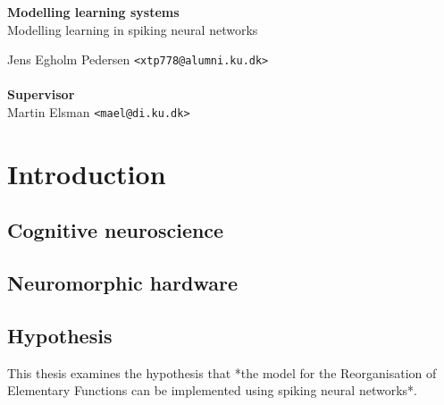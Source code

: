\documentclass[a4paper,oneside]{memoir}
\begin{document}
    \thispagestyle{empty}
    \begin{adjustwidth}{-3cm}{-1.5cm}
    \vspace*{2.5cm}
    \textbf{\Huge Modelling learning systems} \\
    \vspace*{.8cm}
    {\huge Modelling learning in spiking neural networks}\\
    \begin{tabbing}
    Jens Egholm Pedersen \hspace{1cm} \= \texttt{<xtp778@alumni.ku.dk>} \\
    \\[11cm]

    \textbf{\Large Supervisor} \\
    Martin Elsman \hspace{1cm} \texttt{<mael@di.ku.dk>}
    \end{tabbing}
    \end{adjustwidth}

    \newpage

    \ClearWallPaper

\renewcommand\cftchapteraftersnumb{\normalfont}
\renewcommand\cftbeforechapterskip{5pt plus 1pt}

\frontmatter
\setcounter{tocdepth}{2}
\tableofcontents*
\newpage

\mainmatter
\chapter{Introduction}

  \section{Cognitive neuroscience}
  \section{Neuromorphic hardware}
  \section{Hypothesis}
  This thesis examines the hypothesis that *the model for the Reorganisation of Elementary Functions can be implemented using spiking neural networks*.
\end{document}
